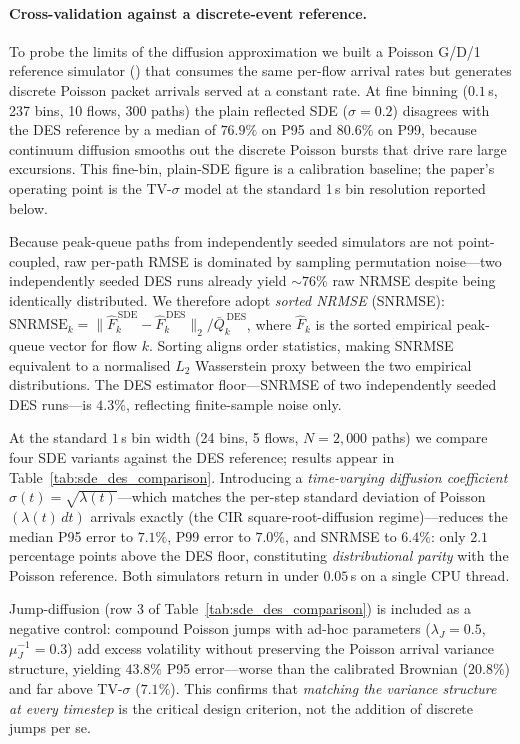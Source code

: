 \documentclass[pdflatex,sn-mathphys-num]{sn-jnl}
\theoremstyle{thmstyleone}%
\theoremstyle{thmstyletwo}%
\theoremstyle{thmstylethree}%
\begin{document}
\paragraph{Cross-validation against a discrete-event reference.}
To probe the limits of the diffusion approximation we built a Poisson G/D/1 reference simulator
() that consumes the same per-flow arrival rates but
generates discrete Poisson packet arrivals served at a constant rate.  At fine binning
($0.1$\,s, 237 bins, 10 flows, 300 paths) the plain reflected SDE ($\sigma=0.2$) disagrees with
the DES reference by a median of $76.9\%$ on P95 and $80.6\%$ on P99, because continuum
diffusion smooths out the discrete Poisson bursts that drive rare large excursions.
This fine-bin, plain-SDE figure is a calibration baseline; the paper's operating point is
the TV-$\sigma$ model at the standard 1\,s bin resolution reported below.

Because peak-queue paths from independently seeded simulators are not point-coupled, raw
per-path RMSE is dominated by sampling permutation noise—two independently seeded DES runs
already yield $\sim\!76\%$ raw NRMSE despite being identically distributed.  We therefore
adopt \emph{sorted NRMSE} (SNRMSE): $\mathrm{SNRMSE}_k = \bigl\|\hat{F}_k^{\,\mathrm{SDE}}
- \hat{F}_k^{\,\mathrm{DES}}\bigr\|_2 / \bar{Q}_k^{\,\mathrm{DES}}$, where $\hat{F}_k$
is the sorted empirical peak-queue vector for flow $k$.  Sorting aligns order statistics,
making SNRMSE equivalent to a normalised $L_2$ Wasserstein proxy between the two empirical
distributions.  The DES estimator floor—SNRMSE of two independently seeded DES runs—is
$4.3\%$, reflecting finite-sample noise only.

At the standard $1$\,s bin width (24 bins, 5 flows, $N=2{,}000$ paths) we compare four SDE
variants against the DES reference; results appear in Table~\ref{tab:sde_des_comparison}.
Introducing a \emph{time-varying diffusion coefficient} $\sigma(t)=\sqrt{\lambda(t)}$—which
matches the per-step standard deviation of Poisson$(\lambda(t)\,dt)$ arrivals exactly (the CIR
square-root-diffusion regime)—reduces the median P95 error to $7.1\%$, P99 error to $7.0\%$,
and SNRMSE to $6.4\%$: only $2.1$ percentage points above the DES floor, constituting
\emph{distributional parity} with the Poisson reference.  Both simulators return in under
$0.05$\,s on a single CPU thread.

Jump-diffusion (row 3 of Table~\ref{tab:sde_des_comparison}) is included as a negative
control: compound Poisson jumps with ad-hoc parameters ($\lambda_J{=}0.5$,
$\mu_J^{-1}{=}0.3$) add excess volatility without preserving the Poisson arrival variance
structure, yielding $43.8\%$ P95 error---worse than the calibrated Brownian ($20.8\%$) and
far above TV-$\sigma$ ($7.1\%$). This confirms that \emph{matching the variance structure at
every timestep} is the critical design criterion, not the addition of discrete jumps per se.
\end{document}
